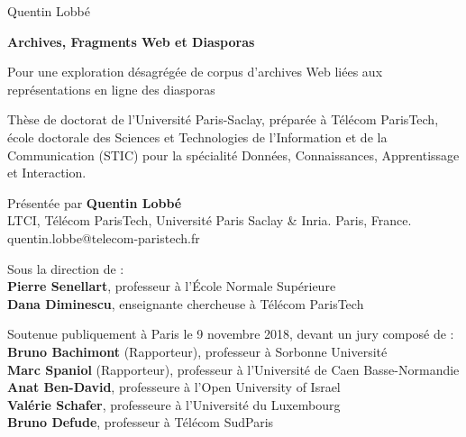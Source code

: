 \documentclass[symmetric,justified,marginals=raggedouter]{tufte-book}
\begin{document}
\frontmatter


\newpage
\cleardoublepage
{  
  \begin{fullwidth}%
  \thispagestyle{empty} 
  \setlength{\parskip}{\baselineskip}
  \begingroup
  \vspace*{3em}
  \par\noindent\Large{Quentin Lobbé}
  \vspace*{-1em}
  \par\noindent\Huge\textbf{Archives, Fragments Web et Diasporas}  
  \par\noindent\nohyphenation\Large{Pour une exploration désagrégée de corpus d'archives Web liées aux représentations en ligne des diasporas}
  \endgroup
  \vfill  
  
  \par\noindent Thèse de doctorat de l'Université Paris-Saclay, préparée à Télécom ParisTech, école doctorale des Sciences et Technologies de l'Information et de la Communication (STIC) pour la spécialité Données, Connaissances, Apprentissage et Interaction.

  \par\noindent Présentée par \textbf{Quentin Lobbé}\\
  LTCI, Télécom ParisTech, Université Paris Saclay \& Inria. Paris, France.\\
  quentin.lobbe@telecom-paristech.fr

  \par\noindent Sous la direction de :\\
  \textbf{Pierre Senellart}, professeur à l'École Normale Supérieure\\
  \textbf{Dana Diminescu}, enseignante chercheuse à Télécom ParisTech

  \par\noindent Soutenue publiquement à Paris le 9 novembre 2018, devant un jury composé de :\\
  \textbf{Bruno Bachimont} (Rapporteur), professeur à Sorbonne Université\\
  \textbf{Marc Spaniol} (Rapporteur), professeur à l'Université de Caen Basse-Normandie\\
  \textbf{Anat Ben-David}, professeure à l'Open University of Israel\\
  \textbf{Valérie Schafer}, professeure à l'Université du Luxembourg\\
  \textbf{Bruno Defude}, professeur à Télécom SudParis  
  
  \end{fullwidth}%
}
\end{document}
